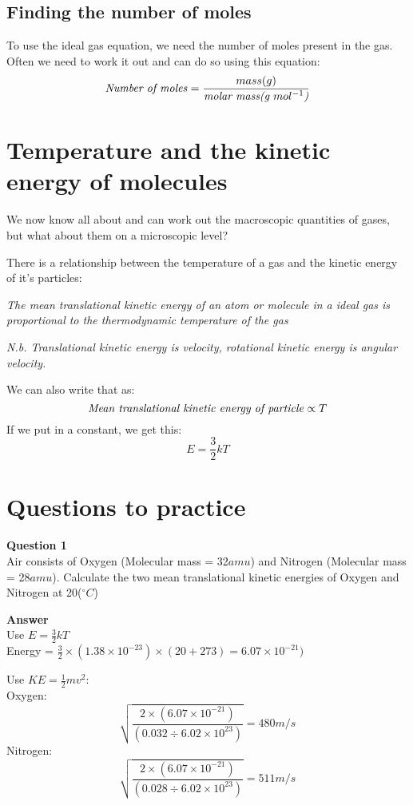 \documentclass{article}
\begin{document}
\subsection*{Finding the number of moles}
To use the ideal gas equation, we need the number of moles present in the gas. Often we need to work it out and can do so using this equation:
\[
	\textrm{\textit{Number of moles}} = \frac{mass(g)}{\textrm{\textit{molar mass(g $mol^{-1}$)}}}
\]

\section*{Temperature and the kinetic energy of molecules}
We now know all about and can work out the macroscopic quantities of gases, but what about them on a microscopic level?

There is a relationship between the temperature of a gas and the kinetic energy of it's particles:

\textit{The mean translational kinetic energy of an atom or molecule in a ideal gas is proportional to the thermodynamic temperature of the gas}

\textit{N.b. Translational kinetic energy is velocity, rotational kinetic energy is angular velocity.}

We can also write that as:
\[
	\textrm{\textit{Mean translational kinetic energy of particle}} \propto T
\]
If we put in a constant, we get this:
\[
	E = \frac{3}{2}kT
\]

\section*{Questions to practice}
\textbf{Question 1}\\
Air consists of Oxygen (Molecular mass = 32$amu$) and Nitrogen (Molecular mass = 28$amu$). Calculate the two mean translational kinetic energies of Oxygen and Nitrogen at 20($^\circ C$)

\textbf{Answer}\\
Use $E = \frac{3}{2}kT$\\
Energy = $\frac{3}{2} \times (1.38 \times 10^{-23}) \times (20+273) = 6.07 \times 10^{-21})$

Use $KE = \frac{1}{2}mv^2$:\\
Oxygen: 
\[
	\sqrt{\frac{2 \times (6.07 \times 10^{-21})}{(0.032 \div 6.02\times 10^{23})}} = 480m/s
\]
Nitrogen: 
\[
	\sqrt{\frac{2 \times (6.07 \times 10^{-21})}{(0.028 \div 6.02\times 10^{23})}} = 511m/s
\]
\end{document}
